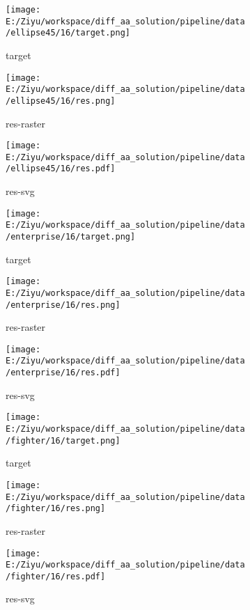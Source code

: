 \documentclass{article}%
\begin{document}
%


\begin{figure}[H]%
\begin{subfigure}[b]{0.32\linewidth}%
\texttt{[image: E:/Ziyu/workspace/diff\_aa\_solution/pipeline/data/ellipse45/16/target.png]}%
\caption{target}%
\end{subfigure}%
\begin{subfigure}[b]{0.32\linewidth}%
\texttt{[image: E:/Ziyu/workspace/diff\_aa\_solution/pipeline/data/ellipse45/16/res.png]}%
\caption{res{-}raster}%
\end{subfigure}%
\begin{subfigure}[b]{0.32\linewidth}%
\texttt{[image: E:/Ziyu/workspace/diff\_aa\_solution/pipeline/data/ellipse45/16/res.pdf]}%
\caption{res{-}svg}%
\end{subfigure}%
\par\vspace{1em}%
\caption{}%
\clearpage%
\end{figure}

%


\begin{figure}[H]%
\begin{subfigure}[b]{0.32\linewidth}%
\texttt{[image: E:/Ziyu/workspace/diff\_aa\_solution/pipeline/data/enterprise/16/target.png]}%
\caption{target}%
\end{subfigure}%
\begin{subfigure}[b]{0.32\linewidth}%
\texttt{[image: E:/Ziyu/workspace/diff\_aa\_solution/pipeline/data/enterprise/16/res.png]}%
\caption{res{-}raster}%
\end{subfigure}%
\begin{subfigure}[b]{0.32\linewidth}%
\texttt{[image: E:/Ziyu/workspace/diff\_aa\_solution/pipeline/data/enterprise/16/res.pdf]}%
\caption{res{-}svg}%
\end{subfigure}%
\par\vspace{1em}%
\caption{}%
\end{figure}

%


\begin{figure}[H]%
\begin{subfigure}[b]{0.32\linewidth}%
\texttt{[image: E:/Ziyu/workspace/diff\_aa\_solution/pipeline/data/fighter/16/target.png]}%
\caption{target}%
\end{subfigure}%
\begin{subfigure}[b]{0.32\linewidth}%
\texttt{[image: E:/Ziyu/workspace/diff\_aa\_solution/pipeline/data/fighter/16/res.png]}%
\caption{res{-}raster}%
\end{subfigure}%
\begin{subfigure}[b]{0.32\linewidth}%
\texttt{[image: E:/Ziyu/workspace/diff\_aa\_solution/pipeline/data/fighter/16/res.pdf]}%
\caption{res{-}svg}%
\end{subfigure}%
\par\vspace{1em}%
\caption{}%
\end{figure}
\end{document}
